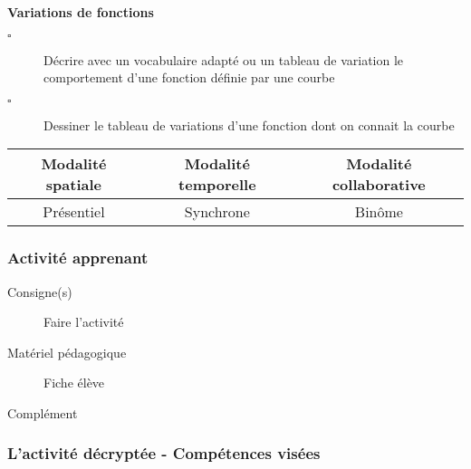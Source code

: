 \begin{seanceprof}

\end{seanceprof}

\begin{CpsCol}
\textbf{Variations de fonctions}
\begin{description}
\item[$\square$] Décrire avec un vocabulaire adapté ou un tableau de variation le comportement d'une fonction définie par une courbe
\item[$\square$] Dessiner le tableau de variations d'une fonction dont on connait la courbe
\end{description}
\end{CpsCol}


\begin{tabular}{|c|c|c|}
\hline 
Modalité spatiale & Modalité temporelle & Modalité collaborative \\ 
\hline 
Présentiel & Synchrone & Binôme \\ 
\hline 
\end{tabular} 


\subsubsection{Activité apprenant}

\begin{description}
\item[Consigne(s)]  Faire l'activité 

\item[Matériel pédagogique] Fiche élève 

\item[Complément] 

\end{description}


\subsubsection{L'activité décryptée - Compétences visées}

